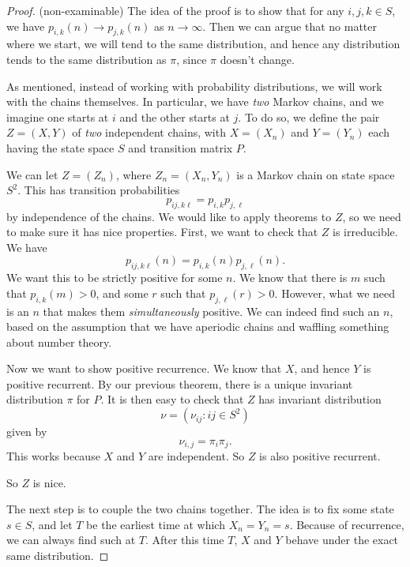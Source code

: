 \documentclass[a4paper]{article}
\begin{document}
\begin{proof}(non-examinable)
  The idea of the proof is to show that for any $i, j, k \in S$, we have $p_{i, k}(n) \to p_{j, k}(n)$ as $n \to \infty$. Then we can argue that no matter where we start, we will tend to the same distribution, and hence any distribution tends to the same distribution as $\pi$, since $\pi$ doesn't change.

  As mentioned, instead of working with probability distributions, we will work with the chains themselves. In particular, we have \emph{two} Markov chains, and we imagine one starts at $i$ and the other starts at $j$. To do so, we define the pair $Z = (X, Y)$ of \emph{two} independent chains, with $X = (X_n)$ and $Y = (Y_n)$ each having the state space $S$ and transition matrix $P$.

  We can let $Z = (Z_n)$, where $Z_n = (X_n, Y_n)$ is a Markov chain on state space $S^2$. This has transition probabilities
  \[
    p_{ij, k\ell} = p_{i, k} p_{j, \ell}
  \]
  by independence of the chains. We would like to apply theorems to $Z$, so we need to make sure it has nice properties. First, we want to check that $Z$ is irreducible. We have
  \[
    p_{ij, k\ell}(n) = p_{i,k} (n) p_{j,\ell}(n).
  \]
  We want this to be strictly positive for some $n$. We know that there is $m$ such that $p_{i,k}(m) > 0$, and some $r$ such that $p_{j,\ell}(r) > 0$. However, what we need is an $n$ that makes them \emph{simultaneously} positive. We can indeed find such an $n$, based on the assumption that we have aperiodic chains and waffling something about number theory.

  Now we want to show positive recurrence. We know that $X$, and hence $Y$ is positive recurrent. By our previous theorem, there is a unique invariant distribution $\pi$ for $P$. It is then easy to check that $Z$ has invariant distribution
  \[
    \nu = (\nu_{ij}: ij \in S^2)
  \]
  given by
  \[
    \nu_{i, j} = \pi_i \pi_j.
  \]
  This works because $X$ and $Y$ are independent. So $Z$ is also positive recurrent.

  So $Z$ is nice.

  The next step is to couple the two chains together. The idea is to fix some state $s \in S$, and let $T$ be the earliest time at which $X_n = Y_n = s$. Because of recurrence, we can always find such at $T$. After this time $T$, $X$ and $Y$ behave under the exact same distribution.


\end{proof}
\end{document}
